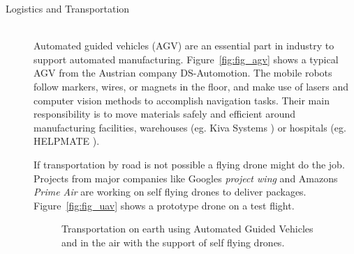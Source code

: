\begin{description}
\item[Logistics and Transportation]\hfill \\
Automated guided vehicles (AGV) are an essential part in industry to support automated manufacturing. Figure~\ref{fig:fig_agv} shows a typical AGV from the Austrian company DS-Automotion.
The mobile robots follow markers, wires, or magnets in the floor, and make use of lasers and computer vision methods to accomplish navigation tasks. 
Their main responsibility is to move materials safely and efficient around manufacturing facilities, warehouses (eg. Kiva Systems \cite{kiva}) or hospitals (eg. HELPMATE \cite{ROB:4520696}). 

If transportation by road is not possible a flying drone might do the job. Projects from major companies like Googles \emph{project wing} and Amazons \emph{Prime Air} are working on self flying drones to deliver packages. 
Figure~\ref{fig:fig_uav} shows a prototype drone on a test flight. 

\begin{figure}[thpb]
	  \myfloatalign
      \footnotesize
      \centering
   \caption[Logistic robots]{Transportation on earth using Automated Guided Vehicles and in the air with the support of self flying drones.}
   \label{fig:fig_transport}
\end{figure}


\end{description}
